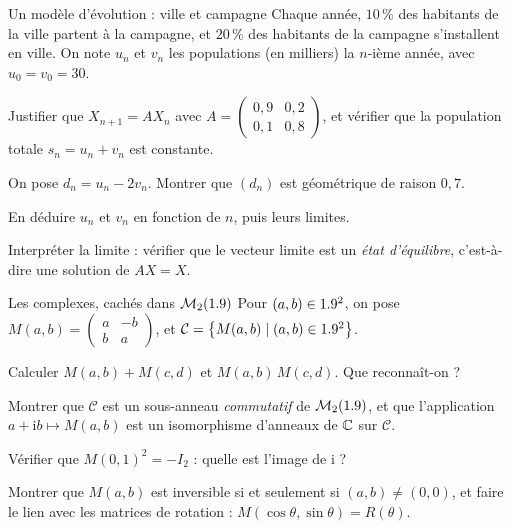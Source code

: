\begin{exercice}[3]{Un modèle d'évolution : ville et campagne}
Chaque année, $10\,\%$ des habitants de la ville partent à la campagne, et
$20\,\%$ des habitants de la campagne s'installent en ville. On note $u_n$
et $v_n$ les populations (en milliers) la $n$-ième année, avec
$u_0=v_0=30$.
\begin{questions}
  \item Justifier que $X_{n+1}=AX_n$ avec
    $A=\begin{pmatrix}0{,}9&0{,}2\\0{,}1&0{,}8\end{pmatrix}$, et vérifier
    que la population totale $s_n=u_n+v_n$ est constante.
  \item On pose $d_n=u_n-2v_n$. Montrer que $(d_n)$ est géométrique de
    raison $0{,}7$.
  \item En déduire $u_n$ et $v_n$ en fonction de $n$, puis leurs limites.
  \item Interpréter la limite : vérifier que le vecteur limite est un
    \emph{état d'équilibre}, c'est-à-dire une solution de $AX=X$.
\end{questions}
\end{exercice}

\begin{exercice}[3]{Les complexes, cachés dans $\mathcal{M}_2(1.9)$}
Pour $(a,b)\in1.9^{2}$, on pose
$M(a,b)=\begin{pmatrix}a&-b\\b&a\end{pmatrix}$, et
$\mathcal{C}=\left\{M(a,b) \mid (a,b)\in1.9^{2}\right\}$.
\begin{questions}
  \item Calculer $M(a,b)+M(c,d)$ et $M(a,b)\,M(c,d)$. Que reconnaît-on ?
  \item Montrer que $\mathcal{C}$ est un sous-anneau \emph{commutatif} de
    $\mathcal{M}_2(1.9)$, et que l'application
    $a+\mathrm{i}b\mapsto M(a,b)$ est un isomorphisme d'anneaux de $\mathbb{C}$
    sur $\mathcal{C}$.
  \item Vérifier que $M(0,1)^{2}=-I_2$ : quelle est l'image de
    $\mathrm{i}$ ?
  \item Montrer que $M(a,b)$ est inversible si et seulement si
    $(a,b)\neq(0,0)$, et faire le lien avec les matrices de rotation :
    $M(\cos\theta,\sin\theta)=R(\theta)$.
\end{questions}
\end{exercice}


